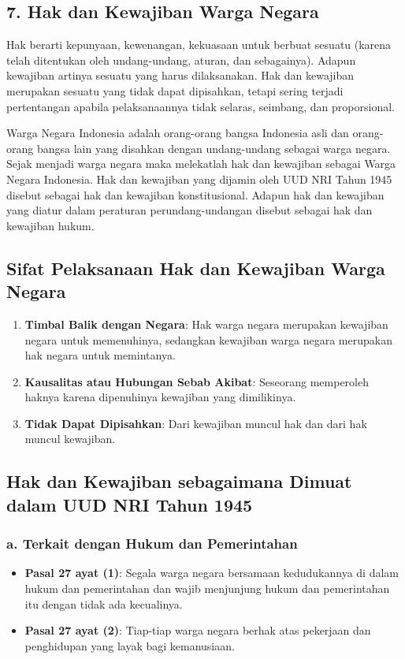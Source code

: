 \subsection{7. Hak dan Kewajiban Warga Negara}
Hak berarti kepunyaan, kewenangan, kekuasaan untuk berbuat sesuatu (karena telah ditentukan oleh undang-undang, aturan, dan sebagainya). Adapun kewajiban artinya sesuatu yang harus dilaksanakan. Hak dan kewajiban merupakan sesuatu yang tidak dapat dipisahkan, tetapi sering terjadi pertentangan apabila pelaksanaannya tidak selaras, seimbang, dan proporsional.

Warga Negara Indonesia adalah orang-orang bangsa Indonesia asli dan orang-orang bangsa lain yang disahkan dengan undang-undang sebagai warga negara. Sejak menjadi warga negara maka melekatlah hak dan kewajiban sebagai Warga Negara Indonesia. Hak dan kewajiban yang dijamin oleh UUD NRI Tahun 1945 disebut sebagai hak dan kewajiban konstitusional. Adapun hak dan kewajiban yang diatur dalam peraturan perundang-undangan disebut sebagai hak dan kewajiban hukum.

\subsection{Sifat Pelaksanaan Hak dan Kewajiban Warga Negara}
\begin{enumerate}
    \item \textbf{Timbal Balik dengan Negara}: Hak warga negara merupakan kewajiban negara untuk memenuhinya, sedangkan kewajiban warga negara merupakan hak negara untuk memintanya.
    \item \textbf{Kausalitas atau Hubungan Sebab Akibat}: Seseorang memperoleh haknya karena dipenuhinya kewajiban yang dimilikinya.
    \item \textbf{Tidak Dapat Dipisahkan}: Dari kewajiban muncul hak dan dari hak muncul kewajiban.
\end{enumerate}

\subsection{Hak dan Kewajiban sebagaimana Dimuat dalam UUD NRI Tahun 1945}

\subsubsection{a. Terkait dengan Hukum dan Pemerintahan}
\begin{itemize}
    \item \textbf{Pasal 27 ayat (1)}: Segala warga negara bersamaan kedudukannya di dalam hukum dan pemerintahan dan wajib menjunjung hukum dan pemerintahan itu dengan tidak ada kecualinya.
    \item \textbf{Pasal 27 ayat (2)}: Tiap-tiap warga negara berhak atas pekerjaan dan penghidupan yang layak bagi kemanusiaan.
\end{itemize}

